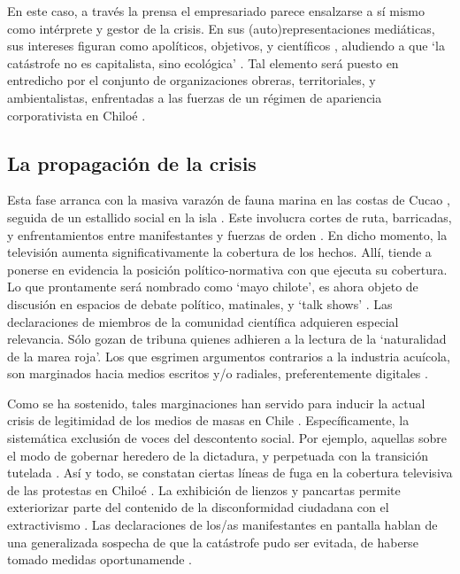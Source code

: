 \documentclass{textolivre}
\begin{document}
En este caso, a través la prensa el empresariado parece ensalzarse a sí mismo
como intérprete y gestor de la crisis. En sus (auto)representaciones mediáticas, sus
intereses figuran como apolíticos, objetivos, y científicos \cite{mosco2016},
aludiendo a que ‘la catástrofe no es capitalista, sino ecológica’ \cite{Foster2016,Gunderson2019}. 
Tal elemento será puesto en entredicho por el
conjunto de organizaciones obreras, territoriales, y ambientalistas, enfrentadas a las
fuerzas de un régimen de apariencia corporativista en Chiloé \cite{Mascareo2018b,ValdebenitoAllendes2018}.


\subsection{La propagación de la crisis}\label{sec-prop-crisis}
Esta fase arranca con la masiva varazón de fauna marina en las costas de Cucao
\cite{Mascareo2018b}, seguida de un estallido social en la isla \cite{cabello2018,ValdebenitoAllendes2018}.
Este involucra cortes de ruta,
barricadas, y enfrentamientos entre manifestantes y fuerzas de orden \cite{24horasa,t13a}. 
En dicho momento, la televisión aumenta significativamente la cobertura de
los hechos. Allí, tiende a ponerse en evidencia la posición político-normativa con que
ejecuta su cobertura. Lo que prontamente será nombrado como ‘mayo chilote’, es ahora
objeto de discusión en espacios de debate político, matinales, y ‘talk shows’ \cite{cnnchile2016b}.
Las declaraciones de miembros de la comunidad científica adquieren especial
relevancia. Sólo gozan de tribuna quienes adhieren a la lectura de la ‘naturalidad de la
marea roja’. Los que esgrimen argumentos contrarios a la industria acuícola, son
marginados hacia medios escritos y/o radiales, preferentemente digitales \cite{ciudadano2016}.

Como se ha sostenido, tales marginaciones han servido para inducir la actual crisis
de legitimidad de los medios de masas en Chile \cite{newman2019,solimano}. 
Específicamente, la sistemática exclusión de voces del descontento social. Por
ejemplo, aquellas sobre el modo de gobernar heredero de la dictadura, y perpetuada con
la transición tutelada \cite{palet,Santander2014,sapiezynska2013}.
Así y todo, se constatan ciertas líneas de fuga en la cobertura televisiva
de las protestas en Chiloé \cite{billi2017}. La exhibición de lienzos y
pancartas permite exteriorizar parte del contenido de la disconformidad ciudadana con el
extractivismo \cite{Gunderson2019}. Las declaraciones de los/as
manifestantes en pantalla hablan de una generalizada sospecha de que la catástrofe pudo
ser evitada, de haberse tomado medidas oportunamende \cite{24horasa,decima2016}.
\end{document}
